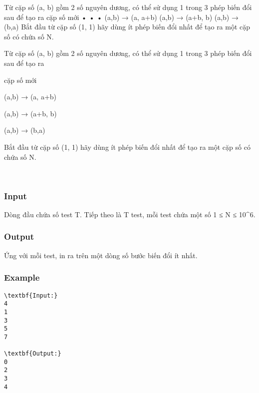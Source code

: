 

Từ cặp số (a, b) gồm 2 số nguyên dương, có thể sử dụng 1 trong 3 phép biến đổi sau để tạo ra cặp số mới • • • (a,b) → (a, a+b) (a,b) → (a+b, b) (a,b) → (b,a) Bắt đầu từ cặp số (1, 1) hãy dùng ít phép biến đổi nhất để tạo ra một cặp số có chứa số N.

Từ cặp số (a, b) gồm 2 số nguyên dương, có thể sử dụng 1 trong 3 phép biến đổi sau để tạo ra

cặp số mới

(a,b) → (a, a+b)

(a,b) → (a+b, b)

(a,b) → (b,a)

Bắt đầu từ cặp số (1, 1) hãy dùng ít phép biến đổi nhất để tạo ra một cặp số có chứa số N.

 

\subsubsection{Input}

Dòng đầu chứa số test T. Tiếp theo là T test, mỗi test chứa một số 1 ≤ N ≤ 10\textasciicircum6.

\subsubsection{Output}

Ứng với mỗi test, in ra trên một dòng số bước biến đổi ít nhất.

\subsubsection{Example}
\begin{verbatim}
\textbf{Input:}
4
1
3
5
7

\textbf{Output:}
0
2
3
4\end{verbatim}